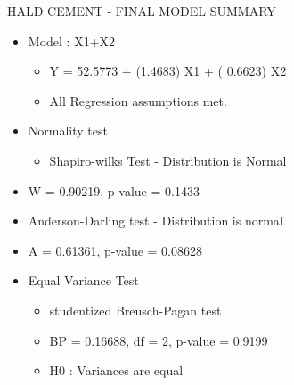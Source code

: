 \documentclass[
  ignorenonframetext,
]{beamer}
\providecommand{\tightlist}{%
  \setlength{\itemsep}{0pt}\setlength{\parskip}{0pt}}
\begin{document}
\begin{frame}{HALD CEMENT - FINAL MODEL SUMMARY}
\protect\hypertarget{hald-cement---final-model-summary}{}
\begin{itemize}
\item
  Model : X1+X2

  \begin{itemize}
  \tightlist
  \item
    Y = 52.5773 + (1.4683) X1 + ( 0.6623) X2
  \item
    All Regression assumptions met.
  \end{itemize}
\item
  Normality test

  \begin{itemize}
  \tightlist
  \item
    Shapiro-wilks Test - Distribution is Normal
  \end{itemize}
\item
  W = 0.90219, p-value = 0.1433
\item
  Anderson-Darling test - Distribution is normal
\item
  A = 0.61361, p-value = 0.08628
\item
  Equal Variance Test

  \begin{itemize}
  \tightlist
  \item
    studentized Breusch-Pagan test
  \item
    BP = 0.16688, df = 2, p-value = 0.9199
  \item
    H0 : Variances are equal
  \end{itemize}
\end{itemize}
\end{frame}
\end{document}
